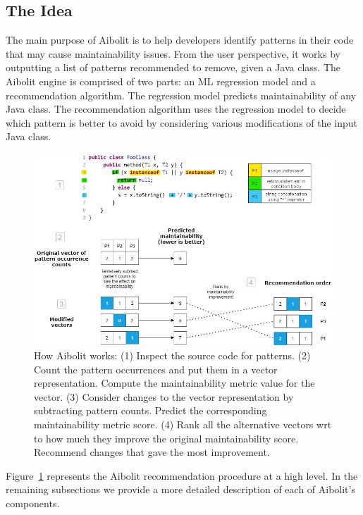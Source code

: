 
\subsection{The Idea}

The main purpose of Aibolit is to help developers identify  patterns in their
code that may cause maintainability issues. From the user perspective, it works
by outputting a list of patterns recommended to remove, given a Java class. The
Aibolit engine is comprised of two parts: an ML regression model and a
recommendation algorithm. The regression model  predicts maintainability of any
Java class. The recommendation algorithm uses the regression model to decide
which pattern is better to avoid by considering various modifications
of the input Java class.

\begin{figure}[t]
\includegraphics[width=13cm]{how_it_works_diagram_5.jpg}
\centering
\vspace{1 cm}
\caption{How Aibolit works: (1) Inspect the source code for patterns.
(2) Count the pattern occurrences and put them in a vector representation.
Compute the maintainability metric value for the vector.
(3) Consider changes to the vector representation by subtracting pattern counts.
Predict the corresponding maintainability metric score.
(4) Rank all the alternative vectors wrt to how much they improve the original
maintainability score. Recommend changes that gave the most improvement.}
\label{fig:aibolit_graphic}
\end{figure}

Figure~\ref{fig:aibolit_graphic} represents the Aibolit recommendation procedure at a high level.
In the remaining subsections we provide a more detailed
description of each of Aibolit's components.


